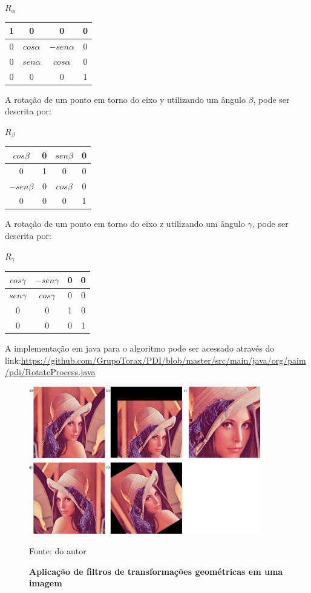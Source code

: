\documentclass[
	12pt,				%
	oneside,			%
	a4paper,			%
	english,			%
	french,				%
	spanish,			%
	brazil,				%
	]{abntex2}
\begin{document}
\(R_\alpha\)
\begin{tabular}{|c|c|c|c|}
	\hline
    1 &             0 &              0 & 0   \\ \hline
	0 & \(cos\alpha\) & \(-sen\alpha\) & 0   \\ \hline   
	0 & \(sen\alpha\) &  \(cos\alpha\) & 0   \\ \hline   
	0 &             0 &              0 & 1   \\ \hline   
\end{tabular}

A rotação de um ponto em torno do eixo y utilizando um ângulo \(\beta\), pode ser descrita por:

\(R_\beta\)
\begin{tabular}{|c|c|c|c|}
	\hline
     \(cos\beta\) & 0 & \(sen\beta\) & 0   \\ \hline
	            0 & 1 & 0            & 0   \\ \hline   
	\(-sen\beta\) & 0 & \(cos\beta\) & 0   \\ \hline   
                0 & 0 &            0 & 1   \\ \hline   
\end{tabular}

A rotação de um ponto em torno do eixo z utilizando um ângulo \(\gamma\), pode ser descrita por:

\(R_\gamma\)
\begin{tabular}{|c|c|c|c|}
	\hline
    \(cos\gamma\) & \(-sen\gamma\) & 0 & 0   \\ \hline
	\(sen\gamma\) &  \(cos\gamma\) & 0 & 0   \\ \hline   
	            0 &              0 & 1 & 0   \\ \hline   
                0 &              0 & 0 & 1   \\ \hline   
\end{tabular}

A implementação em java para o algoritmo pode ser acessado através do link:\url{https://github.com/GrupoTorax/PDI/blob/master/src/main/java/org/paim/pdi/RotateProcess.java}

\begin{figure}[ht]
\centering
\caption{\textbf{Aplicação de filtros de transformações geométricas em uma imagem}}
\includegraphics[width=0.9\textwidth]{imagens/transformacoesgeometricas.png}

Fonte: do autor
\label{fig:transformacoesgeometricas}
\end{figure}
\end{document}
